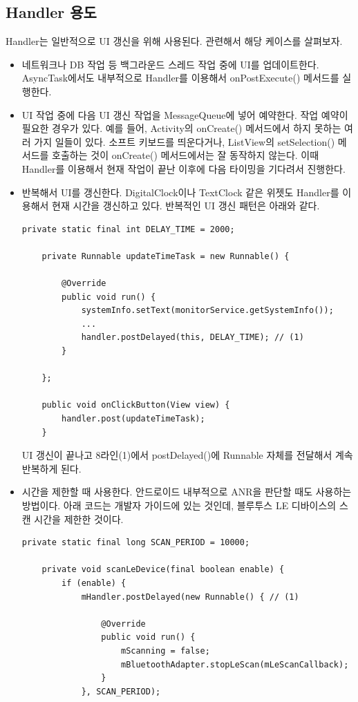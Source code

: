 \subsection{Handler 용도}
Handler는 일반적으로 UI 갱신을 위해 사용된다. 관련해서 해당 케이스를 살펴보자.
\begin{itemize}
\item 네트워크나 DB 작업 등 백그라운드 스레드 작업 중에 UI를 업데이트한다.
AsyncTask에서도 내부적으로 Handler를 이용해서 onPostExecute() 메서드를 실행한다.

\item UI 작업 중에 다음 UI 갱신 작업을 MessageQueue에 넣어 예약한다. 작업 예약이 필요한 경우가 있다.
예를 들어, Activity의 onCreate() 메서드에서 하지 못하는 여러 가지 일들이 있다. 
소프트 키보드를 띄운다거나, ListView의 setSelection() 메서드를 호출하는 것이 onCreate() 메서드에서는 잘 동작하지 않는다. 
이때 Handler를 이용해서 현재 작업이 끝난 이후에 다음 타이밍을 기다려서 진행한다.

\item 반복해서 UI를 갱신한다. DigitalClock이나 TextClock 같은 위젯도 Handler를 이용해서 현재 시간을 갱신하고 있다.
반복적인 UI 갱신 패턴은 아래와 같다.
\begin{lstlisting}[frame=single] 
  	private static final int DELAY_TIME = 2000;
  	
	private Runnable updateTimeTask = new Runnable() {

		@Override
		public void run() {
			systemInfo.setText(monitorService.getSystemInfo());
			...
			handler.postDelayed(this, DELAY_TIME); // (1)
		}

	};
	
	public void onClickButton(View view) {
		handler.post(updateTimeTask); 
	}
\end{lstlisting}
UI 갱신이 끝나고 8라인(1)에서 postDelayed()에 Runnable 자체를 전달해서 계속 반복하게 된다.

\item 시간을 제한할 때 사용한다. 안드로이드 내부적으로 ANR을 판단할 때도 사용하는 방법이다.
아래 코드는 개발자 가이드에 있는 것인데, 블루투스 LE 디바이스의 스캔 시간을 제한한 것이다.
\begin{lstlisting}[frame=single] 
	private static final long SCAN_PERIOD = 10000;
	
	private void scanLeDevice(final boolean enable) {
	    if (enable) {
	    	mHandler.postDelayed(new Runnable() { // (1)
	    		
	    		@Override
	    		public void run() {
	    			mScanning = false;
	    			mBluetoothAdapter.stopLeScan(mLeScanCallback);
	    		}
	    	}, SCAN_PERIOD);
	

\end{lstlisting}
\end{itemize}
